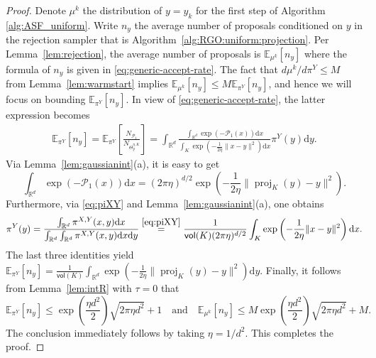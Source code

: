 \documentclass[11pt,letterpaper]{article}
\newcommand{\R}{\mathbb{R}}
\newcommand{\E}{\mathbb{E}}
\newcommand{\proj}{\operatorname{proj}}
\newcommand{\D}{\mathrm{d}}
\newcommand{\vol}{\mathsf{vol}}
\begin{document}
\begin{proof}
 Denote $\mu^k$ the distribution of $y=y_k$ for the first step of Algorithm \ref{alg:ASF_uniform}. Write $n_y$ the average number of proposals conditioned on $y$ in the rejection sampler that is Algorithm~\ref{alg:RGO:uniform:projection}. Per Lemma~\ref{lem:rejection}, the average number of proposals is $\E_{\mu^k}[n_y]$ where the formula of $n_y$ is given in \eqref{eq:generic-accept-rate}. The fact that $d\mu^k/d\pi^Y\leq M$ from Lemma~\ref{lem:warmstart} implies $\E_{\mu^k}[n_y] \le M \E_{\pi^Y}[n_y]$, 
and hence we will focus on bounding $\E_{\pi^Y}[n_y]$. In view of \eqref{eq:generic-accept-rate}, the latter expression becomes
\begin{align*}
    \E_{\pi^Y}[n_y]  = \E_{\pi^Y}\left[\frac{N_{\mathcal{P}_1}}{N_{\Theta_y^{\eta,K}} }\right]= \int_{\R^d} \frac{\int_{\R^d} \exp(-\mathcal{P}_1(x)) \D x}{\int_K \exp\left(-\frac{1}{2\eta}\|x-y\|^2\right) \D x} \pi^Y(y) \D y. 
\end{align*}
 Via Lemma~\ref{lem:gaussianint}(a), it is easy to get  
 \[
 \int_{\R^d} \exp(-\mathcal{P}_1(x)) \D x = (2\pi \eta)^{d/2} \exp\left(-\frac{1}{2\eta}\|\proj_K(y)-y\|^2\right). 
 \]
 Furthermore, via \eqref{eq:piXY} and Lemma~\ref{lem:gaussianint}(a), one obtains
\begin{align}
\label{for:piy}
          \pi^Y(y) = \frac{\int_{\R^d} \pi^{X,Y}(x,y) \D x}{\int_{\R^d} \int_{\R^d} \pi^{X,Y}(x,y) \D x \D y} \stackrel{\eqref{eq:piXY}}= \frac{1}{\vol(K) (2\pi \eta)^{d/2}} \int_K \exp\left(-\frac{1}{2\eta}\|x-y\|^2\right) \D x. 
\end{align}
The last three identities yield $	\E_{\pi^Y}[n_y] 
	= \frac{1}{\vol(K)}  \int_{\R^d} \exp\left(-\frac{1}{2\eta}\|\proj_K(y)-y\|^2\right) \D y$. 
	Finally, it follows from Lemma~\ref{lem:intR} with $\tau =0$ that
	\[
	\E_{\pi^Y}[n_y] \le \exp\left(\frac{\eta d^2}{2}\right) \sqrt{2\pi \eta d^2} +1\quad\text{and}\quad \E_{\mu^k}[n_y] \le M\exp\left(\frac{\eta d^2}{2}\right) \sqrt{2\pi \eta d^2}+M.
	\]
	The conclusion immediately follows by taking $\eta = 1/d^2$. This completes the proof. 
\end{proof}




\end{document}
